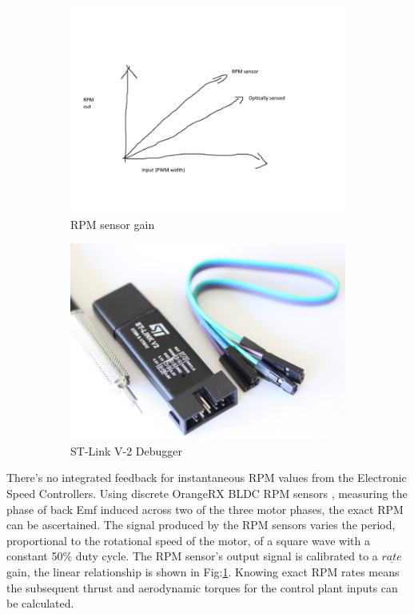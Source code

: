 \begin{figure}[htb]
\begin{subfigure}{0.5\textwidth}
\centering
\includegraphics[width=\textwidth]{figs/rpm-sensor-plot}
\caption{RPM sensor gain}
\label{fig:rpm-sensor-plot}
\end{subfigure}
\begin{subfigure}{0.5\textwidth}
\centering
\includegraphics[width=\textwidth]{figs/st-link}
\caption{ST-Link V-2 Debugger}
\label{fig:st-link}
\end{subfigure}
\caption{}
\end{figure}
There's no integrated feedback for instantaneous RPM values from the Electronic Speed Controllers. Using discrete OrangeRX BLDC RPM sensors \cite{orangerpm}, measuring the phase of back Emf induced across two of the three motor phases, the exact RPM can be ascertained. The signal produced by the RPM sensors varies the period, proportional to the rotational speed of the motor, of a square wave with a constant 50\% duty cycle. The RPM sensor's output signal is calibrated to a $\underline{rate}$ gain, the linear relationship is shown in Fig:\ref{fig:rpm-sensor-plot}. Knowing exact RPM rates means the subsequent thrust and aerodynamic torques for the control plant inputs can be calculated.
